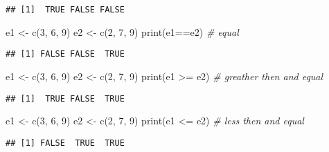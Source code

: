 \documentclass[
]{article}
\newenvironment{Shaded}{\begin{snugshade}}{\end{snugshade}}
\newcommand{\CommentTok}[1]{\textcolor[rgb]{0.56,0.35,0.01}{\textit{#1}}}
\newcommand{\DecValTok}[1]{\textcolor[rgb]{0.00,0.00,0.81}{#1}}
\newcommand{\FunctionTok}[1]{\textcolor[rgb]{0.00,0.00,0.00}{#1}}
\newcommand{\NormalTok}[1]{#1}
\newcommand{\OtherTok}[1]{\textcolor[rgb]{0.56,0.35,0.01}{#1}}
\newcommand{\SpecialCharTok}[1]{\textcolor[rgb]{0.00,0.00,0.00}{#1}}
\begin{document}
\begin{verbatim}
## [1]  TRUE FALSE FALSE
\end{verbatim}

\begin{Shaded}
\begin{Highlighting}[]
\NormalTok{e1 }\OtherTok{\textless{}{-}} \FunctionTok{c}\NormalTok{(}\DecValTok{3}\NormalTok{, }\DecValTok{6}\NormalTok{, }\DecValTok{9}\NormalTok{)}
\NormalTok{e2 }\OtherTok{\textless{}{-}} \FunctionTok{c}\NormalTok{(}\DecValTok{2}\NormalTok{, }\DecValTok{7}\NormalTok{, }\DecValTok{9}\NormalTok{)}
\FunctionTok{print}\NormalTok{(e1}\SpecialCharTok{==}\NormalTok{e2) }\CommentTok{\# equal}
\end{Highlighting}
\end{Shaded}

\begin{verbatim}
## [1] FALSE FALSE  TRUE
\end{verbatim}

\begin{Shaded}
\begin{Highlighting}[]
\NormalTok{e1 }\OtherTok{\textless{}{-}} \FunctionTok{c}\NormalTok{(}\DecValTok{3}\NormalTok{, }\DecValTok{6}\NormalTok{, }\DecValTok{9}\NormalTok{)}
\NormalTok{e2 }\OtherTok{\textless{}{-}} \FunctionTok{c}\NormalTok{(}\DecValTok{2}\NormalTok{, }\DecValTok{7}\NormalTok{, }\DecValTok{9}\NormalTok{)}
\FunctionTok{print}\NormalTok{(e1 }\SpecialCharTok{\textgreater{}=}\NormalTok{ e2) }\CommentTok{\# greather then and equal}
\end{Highlighting}
\end{Shaded}

\begin{verbatim}
## [1]  TRUE FALSE  TRUE
\end{verbatim}

\begin{Shaded}
\begin{Highlighting}[]
\NormalTok{e1 }\OtherTok{\textless{}{-}} \FunctionTok{c}\NormalTok{(}\DecValTok{3}\NormalTok{, }\DecValTok{6}\NormalTok{, }\DecValTok{9}\NormalTok{)}
\NormalTok{e2 }\OtherTok{\textless{}{-}} \FunctionTok{c}\NormalTok{(}\DecValTok{2}\NormalTok{, }\DecValTok{7}\NormalTok{, }\DecValTok{9}\NormalTok{)}
\FunctionTok{print}\NormalTok{(e1 }\SpecialCharTok{\textless{}=}\NormalTok{ e2) }\CommentTok{\# less then and equal}
\end{Highlighting}
\end{Shaded}

\begin{verbatim}
## [1] FALSE  TRUE  TRUE
\end{verbatim}
\end{document}
